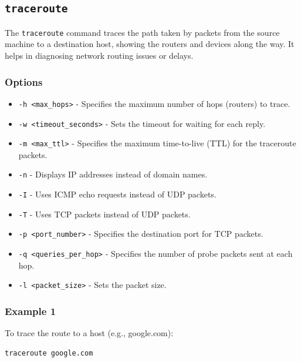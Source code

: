 \documentclass{article}
\begin{document}
\clearpage %

\subsection{\texttt{traceroute}}
The \texttt{traceroute} command traces the path taken by packets from the source machine to a destination host, showing the routers and devices along the way. It helps in diagnosing network routing issues or delays.

\subsubsection{Options}
\begin{itemize}
    \item \texttt{-h \textless max\_hops\textgreater} - Specifies the maximum number of hops (routers) to trace.
    \item \texttt{-w \textless timeout\_seconds\textgreater} - Sets the timeout for waiting for each reply.
    \item \texttt{-m \textless max\_ttl\textgreater} - Specifies the maximum time-to-live (TTL) for the traceroute packets.
    \item \texttt{-n} - Displays IP addresses instead of domain names.
    \item \texttt{-I} - Uses ICMP echo requests instead of UDP packets.
    \item \texttt{-T} - Uses TCP packets instead of UDP packets.
    \item \texttt{-p \textless port\_number\textgreater} - Specifies the destination port for TCP packets.
    \item \texttt{-q \textless queries\_per\_hop\textgreater} - Specifies the number of probe packets sent at each hop.
    \item \texttt{-l \textless packet\_size\textgreater} - Sets the packet size.
\end{itemize}

\subsubsection{Example 1}
To trace the route to a host (e.g., google.com):
\begin{verbatim}
traceroute google.com
\end{verbatim}

\end{document}
